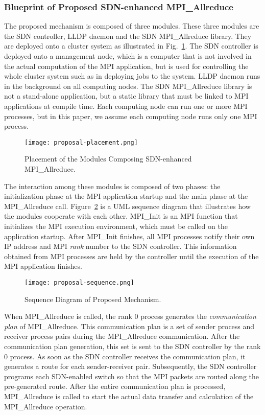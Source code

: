 \subsubsection{Blueprint of Proposed SDN-enhanced MPI\_Allreduce}

The proposed mechanism is composed of three modules. These three modules are
the SDN controller, LLDP daemon and the SDN MPI\_Allreduce library. They are
deployed onto a cluster system as illustrated in
Fig.~\ref{fig-proposal-placement}. The SDN controller is deployed onto a
management node, which is a computer that is not involved in the actual
computation of the MPI application, but is used for controlling the whole
cluster system such as in deploying jobs to the system. LLDP daemon runs in
the background on all computing nodes. The SDN MPI\_Allreduce library is not a
stand-alone application, but a static library that must be linked to MPI
applications at compile time. Each computing node can run one or more MPI
processes, but in this paper, we assume each computing node runs only one MPI
process.

\begin{figure}
    \centering
    \texttt{[image: proposal-placement.png]}
    \caption{Placement of the Modules Composing SDN-enhanced MPI\_Allreduce.}%
    \label{fig-proposal-placement}
\end{figure}

The interaction among these modules is composed of two phases: the
initialization phase at the MPI application startup and the main phase at the
MPI\_Allreduce call. Figure~\ref{fig-proposal-sequence} is a UML sequence
diagram that illustrates how the modules cooperate with each other. MPI\_Init
is an MPI function that initializes the MPI execution environment, which must
be called on the application startup. After MPI\_Init finishes, all MPI
processes notify their own IP address and MPI \emph{rank} number to the SDN
controller. This information obtained from MPI processes are held by the
controller until the execution of the MPI application finishes.

\begin{figure}
    \centering
    \texttt{[image: proposal-sequence.png]}
    \caption{Sequence Diagram of Proposed Mechanism.}%
    \label{fig-proposal-sequence}
\end{figure}

When MPI\_Allreduce is called, the rank 0 process generates the
\emph{communication plan} of MPI\_Allreduce. This communication plan is a set
of sender process and receiver process pairs during the MPI\_Allreduce
communication. After the communication plan generation, this set is sent to
the SDN controller by the rank 0 process. As soon as the SDN controller
receives the communication plan, it generates a route for each sender-receiver
pair. Subsequently, the SDN controller programs each SDN-enabled switch so
that the MPI packets are routed along the pre-generated route. After the
entire communication plan is processed, MPI\_Allreduce is called to start the
actual data transfer and calculation of the MPI\_Allreduce operation.

